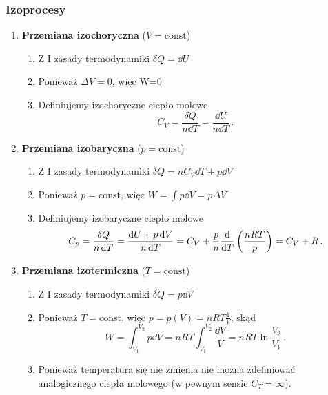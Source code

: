 \documentclass[../main.tex]{subfiles}
\begin{document}
\subsubsection{Izoprocesy}
\begin{enumerate}
    \item \textbf{Przemiana izochoryczna} (\(V=\text{const}\))
    
    \begin{enumerate}
        \item Z I zasady termodynamiki \(\delta Q=\dd{U}\)
        \item Ponieważ \(\Delta V=0\), więc W=0
        \item Definiujemy izochoryczne ciepło molowe 
        \begin{equation*}
            C_V=\frac{\delta Q}{n\dd{T}}=\frac{\dd{U}}{n\dd{T}}\,.
        \end{equation*}
    \end{enumerate}
    
    \item \textbf{Przemiana izobaryczna} (\(p=\text{const}\))
    
    \begin{enumerate}
        \item Z I zasady termodynamiki \(\delta Q=nC_V\dd{T}+p\dd{V}\)
        \item Ponieważ \(p=\text{const}\), więc \( W=\int p\dd{V}=p\Delta V\)
        \item Definiujemy izobaryczne ciepło molowe 
        \begin{equation*}
            C_p=\frac{\delta Q}{n\dd{T}}=\frac{\dd{U}+p\dd{V}}{n\dd{T}}=C_V+\frac{p}{n}\dv{}{T} \left(\frac{nRT}{p}\right)=C_V+R\,.
        \end{equation*}
    \end{enumerate}
    
    \item \textbf{Przemiana izotermiczna} (\(T=\text{const}\))
    
    \begin{enumerate}
        \item Z I zasady termodynamiki \(\delta Q=p\dd{V}\)
        \item Ponieważ \(T=\text{const}\), więc \(p=p(V)=nRT\frac{1}{V}\), skąd
        \begin{equation*}
            W=\int_{V_1}^{V_2}p\dd{V}=nRT\int_{V_1}^{V_2}\frac{\dd{V}}{V}=nRT\ln\frac{V_2}{V_1}\,.
        \end{equation*}
        \item Ponieważ temperatura się nie zmienia nie można zdefiniować analogicznego ciepła molowego (w pewnym sensie \(C_T=\infty\)).\\
    \end{enumerate}
    

\end{enumerate}
\end{document}
